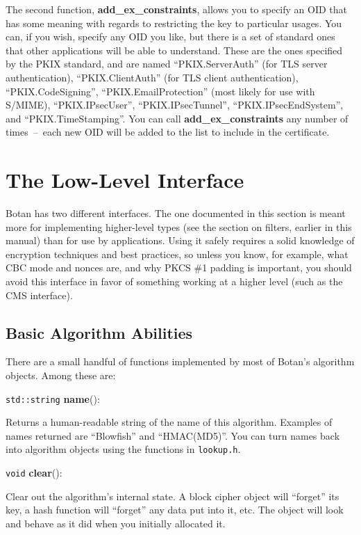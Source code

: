 \documentclass{article}
\newcommand{\filename}[1]{\texttt{#1}}
\newcommand{\function}[1]{\textbf{#1}}
\newcommand{\type}[1]{\texttt{#1}}
\begin{document}
The second function, \function{add\_ex\_constraints}, allows you to specify an
OID that has some meaning with regards to restricting the key to particular
usages. You can, if you wish, specify any OID you like, but there is a set of
standard ones that other applications will be able to understand. These are
the ones specified by the PKIX standard, and are named ``PKIX.ServerAuth'' (for
TLS server authentication), ``PKIX.ClientAuth'' (for TLS client
authentication), ``PKIX.CodeSigning'', ``PKIX.EmailProtection'' (most likely
for use with S/MIME), ``PKIX.IPsecUser'', ``PKIX.IPsecTunnel'',
``PKIX.IPsecEndSystem'', and ``PKIX.TimeStamping''. You can call
\function{add\_ex\_constraints} any number of times~--~each new OID will be
added to the list to include in the certificate.

\section{The Low-Level Interface}

Botan has two different interfaces. The one documented in this section is meant
more for implementing higher-level types (see the section on filters, earlier in
this manual) than for use by applications. Using it safely requires a solid
knowledge of encryption techniques and best practices, so unless you know, for
example, what CBC mode and nonces are, and why PKCS \#1 padding is important,
you should avoid this interface in favor of something working at a higher level
(such as the CMS interface).

\subsection{Basic Algorithm Abilities}

There are a small handful of functions implemented by most of Botan's
algorithm objects. Among these are:

\noindent
\type{std::string} \function{name}():

Returns a human-readable string of the name of this algorithm. Examples of
names returned are ``Blowfish'' and ``HMAC(MD5)''. You can turn names back into
algorithm objects using the functions in \filename{lookup.h}.

\noindent
\type{void} \function{clear}():

Clear out the algorithm's internal state. A block cipher object will
``forget'' its key, a hash function will ``forget'' any data put into
it, etc. The object will look and behave as it did when you initially
allocated it.
\end{document}
